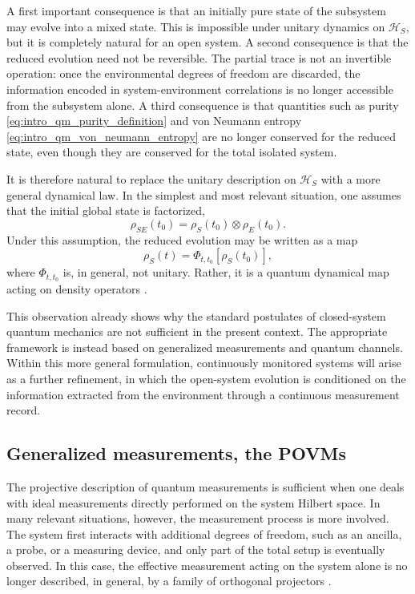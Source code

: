 A first important consequence is that an initially pure state of the subsystem may evolve into a mixed state. This is impossible under unitary dynamics on \(\mathcal{H}_S\), but it is completely natural for an open system. A second consequence is that the reduced evolution need not be reversible. The partial trace is not an invertible operation: once the environmental degrees of freedom are discarded, the information encoded in system-environment correlations is no longer accessible from the subsystem alone. A third consequence is that quantities such as purity \eqref{eq:intro_qm_purity_definition} and von Neumann entropy \eqref{eq:intro_qm_von_neumann_entropy} are no longer conserved for the reduced state, even though they are conserved for the total isolated system.

It is therefore natural to replace the unitary description on \(\mathcal{H}_S\) with a more general dynamical law. In the simplest and most relevant situation, one assumes that the initial global state is factorized,
\begin{equation}
	\rho_{SE}(t_0)=\rho_S(t_0)\otimes \rho_E(t_0).
	\label{eq:open_qs_factorized_initial_condition}
\end{equation}
Under this assumption, the reduced evolution may be written as a map
\begin{equation}
	\rho_S(t)=\Phi_{t,t_0}\!\left[\rho_S(t_0)\right],
	\label{eq:open_qs_quantum_dynamical_map}
\end{equation}
where \(\Phi_{t,t_0}\) is, in general, not unitary. Rather, it is a quantum dynamical map acting on density operators \cite{Vac24,ParisTools12}.

This observation already shows why the standard postulates of closed-system quantum mechanics are not sufficient in the present context. The appropriate framework is instead based on generalized measurements and quantum channels. Within this more general formulation, continuously monitored systems will arise as a further refinement, in which the open-system evolution is conditioned on the information extracted from the environment through a continuous measurement record.



\subsection{Generalized measurements, the POVMs}
\label{subsec:generalized_measurements_and_povms}

The projective description of quantum measurements is sufficient when one deals with ideal measurements directly performed on the system Hilbert space. In many relevant situations, however, the measurement process is more involved. The system first interacts with additional degrees of freedom, such as an ancilla, a probe, or a measuring device, and only part of the total setup is eventually observed. In this case, the effective measurement acting on the system alone is no longer described, in general, by a family of orthogonal projectors \cite{ParisTools12,Vac24}.

